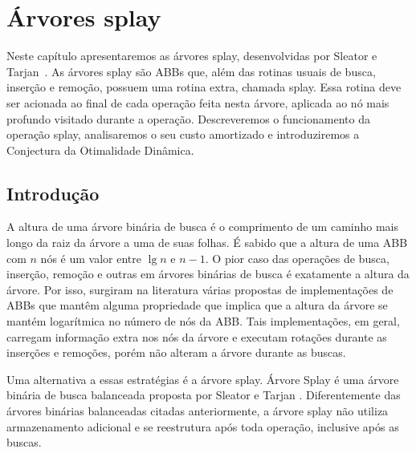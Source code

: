 
\chapter{Árvores splay}
\label{cap:arvores-splay}

\newtheorem{caso}{Caso}

Neste capítulo apresentaremos as árvores splay, desenvolvidas por Sleator e Tarjan~\cite{selfadjustingbst}. As árvores splay são ABBs que, além das rotinas usuais de busca, inserção e remoção, possuem uma rotina extra, chamada splay. Essa rotina deve ser acionada ao final de cada operação feita nesta árvore, aplicada ao nó mais profundo visitado durante a operação. Descreveremos o funcionamento da operação splay, analisaremos o seu custo amortizado e introduziremos a Conjectura da Otimalidade Dinâmica.


\section{Introdução}
A altura de uma árvore binária de busca é o comprimento de um caminho mais longo da raiz da árvore a uma de suas folhas. É sabido que a altura de uma ABB com $n$ nós é um valor entre $\lg n$ e $n-1$. O pior caso das operações de busca, inserção, remoção e outras em árvores binárias de busca é exatamente a altura da árvore. Por isso, surgiram na literatura várias propostas de implementações de ABBs que mantêm alguma propriedade que implica que a altura da árvore se mantém logarítmica no número de nós da ABB. Tais implementações, em geral, carregam informação extra nos nós da árvore e executam rotações durante as inserções e remoções, porém não alteram a árvore durante as buscas.

Uma alternativa a essas estratégias é a árvore splay. Árvore Splay é uma árvore binária de busca balanceada proposta por Sleator e Tarjan \cite{selfadjustingbst}. Diferentemente das árvores binárias balanceadas citadas anteriormente, a árvore splay não utiliza armazenamento adicional e se reestrutura após toda operação, inclusive após as buscas.


